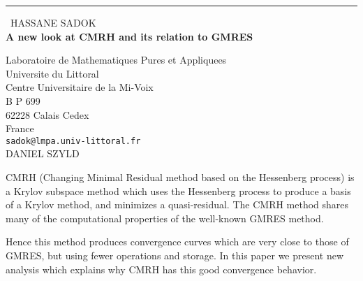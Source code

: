 \documentclass{report}
\begin{document}
\begin{center}
\rule{6in}{1pt} \
{\large HASSANE SADOK \\
{\bf A new look at CMRH and its relation to GMRES}}

Laboratoire de Mathematiques Pures et Appliquees \\ Universite du Littoral \\ Centre Universitaire de la Mi-Voix \\ B P 699 \\ 62228 Calais Cedex \\ France
\\
{\tt sadok@lmpa.univ-littoral.fr}\\
DANIEL SZYLD\end{center}

CMRH (Changing Minimal Residual method based on the Hessenberg process)
is a Krylov subspace method which uses the Hessenberg process to produce
a basis of a Krylov method, and minimizes a quasi-residual. The CMRH
method shares many of the computational properties of the well-known
GMRES method.

Hence this method produces convergence curves which are very close
to those of GMRES, but using fewer operations and storage.
In this paper we present new analysis which explains
why CMRH has this good convergence behavior.
\end{document}
